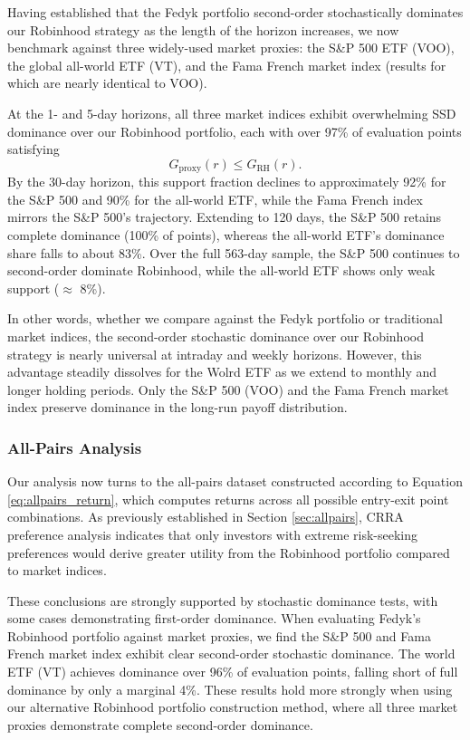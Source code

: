 Having established that the Fedyk portfolio second-order stochastically dominates our Robinhood strategy as the length of the horizon increases, 
we now benchmark against three widely-used market proxies: the S\&P 500 ETF (VOO), the global all-world ETF (VT), and the Fama French market index (results for which are nearly identical to VOO).

At the 1- and 5-day horizons, all three market indices exhibit overwhelming SSD dominance over our Robinhood portfolio, each with over 97\% of evaluation points satisfying
\[
G_{\mathrm{proxy}}(r) \leq G_{\mathrm{RH}}(r).
\]
By the 30-day horizon, this support fraction declines to approximately 92\% for the S\&P 500 and 90\% for the all-world ETF, while the Fama French index mirrors the S\&P 500's trajectory. 
Extending to 120 days, the S\&P 500 retains complete dominance (100\% of points), whereas the all-world ETF's dominance share falls to about 83\%. 
Over the full 563-day sample, the S\&P 500 continues to second-order dominate Robinhood, while the all-world ETF shows only weak support ($\approx$ 8\%).

In other words, whether we compare against the Fedyk portfolio or traditional market indices, the second-order stochastic dominance over our Robinhood strategy is nearly universal at intraday and weekly horizons. 
However, this advantage steadily dissolves for the Wolrd ETF as we extend to monthly and longer holding periods. 
Only the S\&P 500 (VOO) and the Fama French market index preserve dominance in the long-run payoff distribution.

\subsubsection{All-Pairs Analysis}
Our analysis now turns to the all-pairs dataset constructed according to Equation \ref{eq:allpairs_return}, which computes returns across all possible entry-exit point combinations. 
As previously established in Section \ref{sec:allpairs}, CRRA preference analysis indicates that only investors with extreme risk-seeking preferences would derive greater utility from the Robinhood portfolio compared to market indices.

These conclusions are strongly supported by stochastic dominance tests, with some cases demonstrating first-order dominance. 
When evaluating Fedyk's Robinhood portfolio against market proxies, we find the S\&P 500 and Fama French market index exhibit clear second-order stochastic dominance. 
The world ETF (VT) achieves dominance over 96\% of evaluation points, falling short of full dominance by only a marginal 4\%. 
These results hold more strongly when using our alternative Robinhood portfolio construction method, where all three market proxies demonstrate complete second-order dominance.

